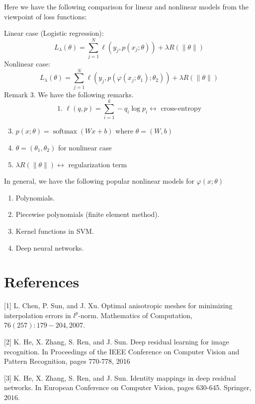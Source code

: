 \documentclass[10pt]{article}
\begin{document}
Here we have the following comparison for linear and nonlinear models from the viewpoint of loss functions:

Linear case (Logistic regression):
$$
L_{\lambda}(\theta)=\sum_{j=1}^{N} \ell\left(y_{j}, p\left(x_{j} ; \theta\right)\right)+\lambda R(\|\theta\|)
$$
Nonlinear case:
$$
L_{\lambda}(\theta)=\sum_{j=1}^{N} \ell\left(y_{j}, p\left(\varphi\left(x_{j} ; \theta_{1}\right) ; \theta_{2}\right)\right)+\lambda R(\|\theta\|)
$$
Remark 3. We have the following remarks.
$$
\text { 1. } \ell(q, p)=\sum_{i=1}^{k}-q_{i} \log p_{i} \leftrightarrow \text { cross-entropy }
$$

  \begin{enumerate}
    \setcounter{enumii}{2}
    \item $p(x ; \theta)=\operatorname{softmax}(W x+b)$ where $\theta=(W, b)$

    \item $\theta=\left(\theta_{1}, \theta_{2}\right)$ for nonlinear case

    \item $\lambda R(\|\theta\|) \leftrightarrow$ regularization term

  \end{enumerate}
In general, we have the following popular nonlinear models for $\varphi(x ; \theta)$

  \begin{enumerate}
    \item Polynomials.

    \item Piecewise polynomials (finite element method).

    \item Kernel functions in SVM.

    \item Deep neural networks.

  \end{enumerate}
\section{References}
[1] L. Chen, P. Sun, and J. Xu. Optimal anisotropic meshes for minimizing interpolation errors in $l^{p}$-norm. Mathematics of Computation, $76(257): 179-204,2007 .$

[2] K. He, X. Zhang, S. Ren, and J. Sun. Deep residual learning for image recognition. In Proceedings of the IEEE Conference on Computer Vision and Pattern Recognition, pages 770-778, 2016

[3] K. He, X. Zhang, S. Ren, and J. Sun. Identity mappings in deep residual networks. In European Conference on Computer Vision, pages 630-645. Springer, $2016 .$
\end{document}
